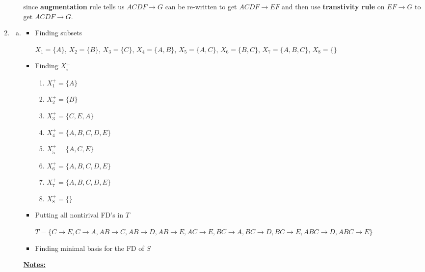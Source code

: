 \documentclass[12pt]{article}
\begin{document}
\begin{enumerate}[1.]
\begin{itemize}
            since \textbf{augmentation} rule tells us $ACDF \to G$ can be
            re-written to get $ACDF \to EF$ and then use \textbf{transtivity rule}
            on $EF \to G$ to get $ACDF \to G$.

        \end{itemize}

    \item

    \begin{enumerate}[a)]
        \item

        \begin{itemize}
            \item Finding subsets

            $X_1 = \{A\}$, $X_2 = \{B\}$, $X_3 = \{C\}$, $X_4 = \{A,B\}$, $X_5 = \{A,C\}$,
            $X_6 = \{B,C\}$, $X_7 = \{A,B,C\}$, $X_8 = \{\}$


            \item Finding $X_i^+$
            \begin{enumerate}[1.]
                \item $X_1^+ = \{A\}$
                \item $X_2^+ = \{B\}$
                \item $X_3^+ = \{C,E,A\}$
                \item $X_4^+ = \{A,B,C,D,E\}$
                \item $X_5^+ = \{A,C,E\}$
                \item $X_6^+ = \{A,B,C,D,E\}$
                \item $X_7^+ = \{A,B,C,D,E\}$
                \item $X_8^+ = \{\}$
            \end{enumerate}

            \item Putting all nontirival FD's in $T$

            $T = \{C \to E, C \to A, AB \to C, AB \to D, AB \to E, AC \to E,
                 BC \to A, BC \to D, BC \to E, ABC \to D, ABC \to E\}$

            \item Finding minimal basis for the FD of $S$


        \end{itemize}

        \bigskip

        \underline{\textbf{Notes:}}

        \bigskip


\end{enumerate}
\end{enumerate}
\end{document}
